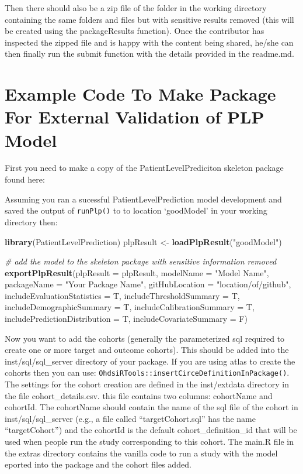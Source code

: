 \documentclass[]{article}
\newenvironment{Shaded}{\begin{snugshade}}{\end{snugshade}}
\newcommand{\KeywordTok}[1]{\textcolor[rgb]{0.13,0.29,0.53}{\textbf{#1}}}
\newcommand{\DataTypeTok}[1]{\textcolor[rgb]{0.13,0.29,0.53}{#1}}
\newcommand{\StringTok}[1]{\textcolor[rgb]{0.31,0.60,0.02}{#1}}
\newcommand{\CommentTok}[1]{\textcolor[rgb]{0.56,0.35,0.01}{\textit{#1}}}
\newcommand{\NormalTok}[1]{#1}
\begin{document}
Then there should also be a zip file of the folder in the working
directory containing the same folders and files but with sensitive
results removed (this will be created using the packageResults
function). Once the contributor has inspected the zipped file and is
happy with the content being shared, he/she can then finally run the
submit function with the details provided in the readme.md.

\section{Example Code To Make Package For External Validation of PLP
Model}\label{example-code-to-make-package-for-external-validation-of-plp-model}

First you need to make a copy of the PatientLevelPrediciton skeleton
package found here:

Assuming you ran a sucessful PatientLevelPrediction model development
and saved the output of \texttt{runPlp()} to to location `goodModel' in
your working directory then:

\begin{Shaded}
\begin{Highlighting}[]
\KeywordTok{library}\NormalTok{(PatientLevelPrediction)}
\NormalTok{plpResult <-}\StringTok{ }\KeywordTok{loadPlpResult}\NormalTok{(}\StringTok{"goodModel"}\NormalTok{)}

\CommentTok{# add the model to the skeleton package with sensitive information removed}
\KeywordTok{exportPlpResult}\NormalTok{(}\DataTypeTok{plpResult =}\NormalTok{ plpResult, }\DataTypeTok{modelName =} \StringTok{"Model Name"}\NormalTok{, }\DataTypeTok{packageName =} \StringTok{"Your Package Name"}\NormalTok{, }
    \DataTypeTok{gitHubLocation =} \StringTok{"location/of/github"}\NormalTok{, }\DataTypeTok{includeEvaluationStatistics =}\NormalTok{ T, }
    \DataTypeTok{includeThresholdSummary =}\NormalTok{ T, }\DataTypeTok{includeDemographicSummary =}\NormalTok{ T, }\DataTypeTok{includeCalibrationSummary =}\NormalTok{ T, }
    \DataTypeTok{includePredictionDistribution =}\NormalTok{ T, }\DataTypeTok{includeCovariateSummary =}\NormalTok{ F)}
\end{Highlighting}
\end{Shaded}

Now you want to add the cohorts (generally the parameterized sql
required to create one or more target and outcome cohorts). This should
be added into the inst/sql/sql\_server directory of your package. If you
are using atlas to create the cohorts then you can use:
\texttt{OhdsiRTools::insertCirceDefinitionInPackage()}. The settings for
the cohort creation are defined in the inst/extdata directory in the
file cohort\_details.csv. this file contains two columns: cohortName and
cohortId. The cohortName should contain the name of the sql file of the
cohort in inst/sql/sql\_server (e.g., a file called ``targetCohort.sql''
has the name ``targetCohort'') and the cohortId is the default
cohort\_definition\_id that will be used when people run the study
corresponding to this cohort. The main.R file in the extras directory
contains the vanilla code to run a study with the model eported into the
package and the cohort files added.
\end{document}
